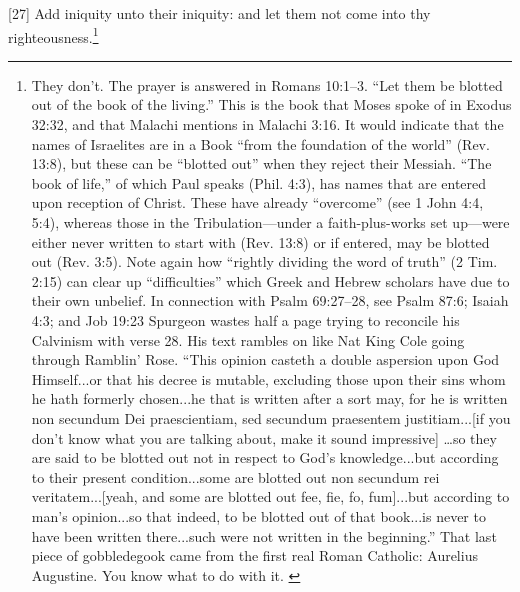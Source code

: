 [27] \textcolor[rgb]{0.00,0.00,1.00}{Add iniquity unto their iniquity: and let them not come into thy righteousness.}\footnote{They don’t. The prayer is answered in
Romans 10:1–3. “Let them be blotted out of the
book of the living.” This is the book that Moses
spoke of in Exodus 32:32, and that Malachi
mentions in Malachi 3:16. It would indicate that
the names of Israelites are in a Book “from the
foundation of the world” (Rev. 13:8), but these
can be “blotted out” when they reject their
Messiah. “The book of life,” of which Paul
speaks (Phil. 4:3), has names that are entered
upon reception of Christ. These have already
“overcome” (see 1 John 4:4, 5:4), whereas those
in the Tribulation—under a faith-plus-works set
up—were either never written to start with (Rev.
13:8) or if entered, may be blotted out (Rev. 3:5).
Note again how “rightly dividing the word of
truth” (2 Tim. 2:15) can clear up “difficulties”
which Greek and Hebrew scholars have due to
their own unbelief.
In connection with Psalm 69:27–28, see Psalm
87:6; Isaiah 4:3; and Job 19:23 Spurgeon wastes
half a page trying to reconcile his Calvinism with
verse 28. His text rambles on like Nat King Cole
going through Ramblin’ Rose. “This opinion
casteth a double aspersion upon God Himself...or
that his decree is mutable, excluding those upon
their sins whom he hath formerly chosen...he that
is written after a sort may, for he is written non
secundum Dei praescientiam, sed secundum
praesentem justitiam...[if you don’t know what
you are talking about, make it sound impressive]
…so they are said to be blotted out not in respect
to God’s knowledge...but according to their
present condition...some are blotted out non
secundum rei veritatem...[yeah, and some are
blotted out fee, fie, fo, fum]...but according to
man’s opinion...so that indeed, to be blotted out
of that book...is never to have been written
there...such were not written in the beginning.”
That last piece of gobbledegook came from the
first real Roman Catholic: Aurelius Augustine.
You know what to do with it. \cite{Ruckman1992Psalms}  }

